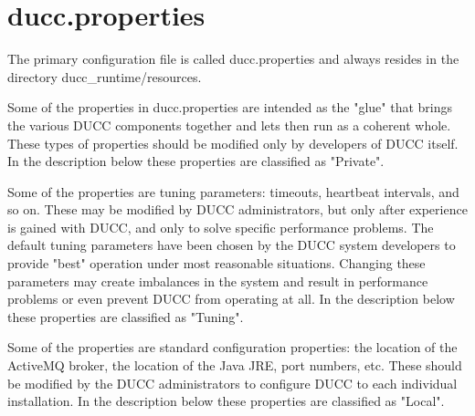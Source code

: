 \section{ducc.properties}

    The primary configuration file is called ducc.properties and always resides in the directory
    ducc\_runtime/resources.

    Some of the properties in ducc.properties are intended as the "glue" that brings the various 
    DUCC components together and lets then run as a coherent whole. These types of properties should 
    be modified only by developers of DUCC itself. In the description below these properties are 
    classified as "Private". 

    Some of the properties are tuning parameters: timeouts, heartbeat intervals, and so on. These
    may be modified by DUCC administrators, but only after experience is gained with DUCC, and only
    to solve specific performance problems. The default tuning parameters have been chosen by the
    DUCC system developers to provide "best" operation under most reasonable situations. Changing
    these parameters may create imbalances in the system and result in performance problems or even
    prevent DUCC from operating at all. In the description below these properties are classified as
    "Tuning".

    Some of the properties are standard configuration properties: the location of the ActiveMQ
    broker, the location of the Java JRE, port numbers, etc. These should be modified by the DUCC
    administrators to configure DUCC to each individual installation. In the description below these
    properties are classified as "Local".

